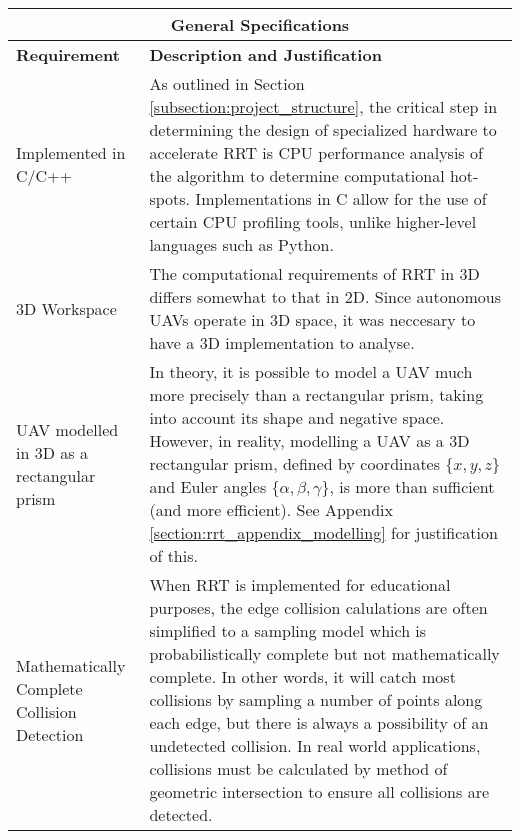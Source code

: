 
\begin{table}[H]
\begin{center}
\begin{tabular}{|p{.2\linewidth}|p{.74\linewidth}|}
    \hline
    \multicolumn{2}{|c|}{\textbf{General Specifications}} \\
    \hline
    \textbf{Requirement}             & \textbf{Description and Justification} \\
    \hline
    Implemented in C/C++    & 
        As outlined in Section \ref{subsection:project_structure}, the critical step in determining the design of specialized hardware to accelerate \gls{RRT} is CPU performance analysis of the algorithm to determine computational hot-spots. Implementations in C allow for the use of certain CPU profiling tools, unlike higher-level languages such as Python. \\
    \hline
    3D Workspace            & 
        The computational requirements of \gls{RRT} in \gls{3D} differs somewhat to that in \gls{2D}. Since autonomous \glspl{UAV} operate in 3D space, it was neccesary to have a \gls{3D} implementation to analyse. \\
    \hline
    \Gls{UAV} modelled in \gls{3D} as a rectangular prism  & 
        In theory, it is possible to model a \gls{UAV} much more precisely than a rectangular prism, taking into account its shape and negative space. However, in reality, modelling a \gls{UAV} as a \gls{3D} rectangular prism, defined by coordinates $\{x, y, z\}$ and Euler angles $\{\alpha, \beta, \gamma \}$, is more than sufficient (and more efficient). See Appendix \ref{section:rrt_appendix_modelling} for justification of this. \\
    \hline
    Mathematically Complete Collision Detection & 
        When \gls{RRT} is implemented for educational purposes, the edge collision calulations are often simplified to a sampling model which is \gls{probabilistically complete} but not \gls{mathematically complete}. In other words, it will catch most collisions by sampling a number of points along each edge, but there is always a possibility of an undetected collision. In real world applications, collisions must be calculated by method of geometric intersection to ensure all collisions are detected. \\
    \hline
\end{tabular}
\label{table:RRT_Tech_Specs_General}
\end{center}
\end{table}


